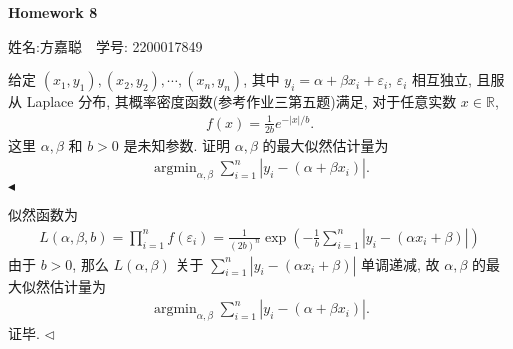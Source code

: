 \documentclass[11pt]{article}
\newenvironment{problem}[2][Problem]{\begin{trivlist}
    \item[\hskip \labelsep {\bfseries #1}\hskip \labelsep {\bfseries #2.}]\songti}{\hfill$\blacktriangleleft$\end{trivlist}}
\newenvironment{answer}[1][Solution]{\begin{trivlist}
    \item[\hskip \labelsep {\bfseries #1.}\hskip \labelsep]}{\hfill$\lhd$\end{trivlist}}
\newcommand\1{\mathds{1}}
\newcommand\R{\mathbb{R}}
\DeclareMathOperator*{\argmin}{argmin}
\begin{document}
\kaishu

\pagestyle{fancy}
\chead{}
\fancyfoot[R]{} 
\fancyfoot[C]{\thepage\ /\ \pageref{LastPage} \\ \textcolor{lightgray}{最后编译时间: \today}}


\begin{center}
    {\LARGE \bf Homework 8}

    {姓名:方嘉聪\ \  学号: 2200017849}            %
\end{center}

\begin{problem}{1}
    给定 $(x_1,y_1), (x_2,y_2), \cdots, (x_n,y_n)$, 其中 $y_i = \alpha + \beta x_i + \varepsilon_i$, 
    $\varepsilon_i$ 相互独立, 且服从 Laplace 分布, 其概率密度函数(参考作业三第五题)满足, 对于任意实数 $x\in \R$,
    \begin{align*}
        f(x) = \frac{1}{2b} e^{-|x|/b}.
    \end{align*}
    这里 $\alpha, \beta$ 和 $b > 0$ 是未知参数. 证明 $\alpha, \beta$ 的最大似然估计量为
    \begin{align*}
        \argmin_{\alpha, \beta} \sum_{i=1}^n |y_i - (\alpha + \beta x_i)|.
    \end{align*} 
\end{problem}
\begin{answer}
    似然函数为
    \begin{align*}
        L(\alpha, \beta, b) = \prod_{i=1}^{n} f(\varepsilon_i) = \frac{1}{(2b)^{n}} \exp\left(-\frac{1}{b}\sum_{i=1}^{n}|y_i - (\alpha x_i + \beta)|\right)
    \end{align*}
    由于 $b > 0$, 那么 $L(\alpha, \beta)$ 关于 $\sum_{i=1}^{n} |y_i - (\alpha x_i + \beta)|$ 单调递减, 故 $\alpha, \beta$ 的最大似然估计量为
    \begin{align*}
        \argmin_{\alpha, \beta} \sum_{i=1}^n |y_i - (\alpha + \beta x_i)|.
    \end{align*}
    证毕.
\end{answer}
\end{document}
